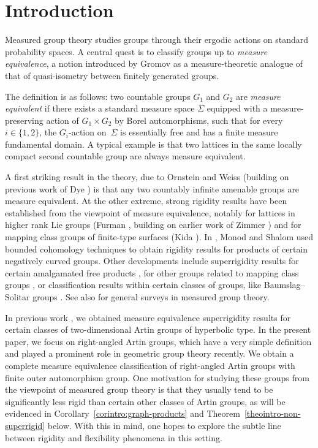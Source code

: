 \documentclass[11pt]{article}
\numberwithin{equation}{section}
\theoremstyle{plain}
\theoremstyle{definition}
\begin{document}
\section*{Introduction}

Measured group theory studies groups through their ergodic actions on standard probability spaces.
A central quest is to classify groups up to \emph{measure equivalence}, a notion introduced by Gromov \cite{Gro} as a measure-theoretic analogue of that of quasi-isometry between finitely generated groups.

The definition is as follows: two countable groups $G_1$ and $G_2$ are \emph{measure equivalent} if there exists a standard measure space $\Sigma$ equipped with a measure-preserving action of $G_1\times G_2$ by Borel automorphisms, such that for every $i\in\{1,2\}$, the $G_i$-action on~$\Sigma$ is essentially free and has a finite measure fundamental domain. A typical example is that two lattices in the same locally compact second countable group are always measure equivalent.

A first striking result in the theory, due to Ornstein and Weiss \cite{OW} (building on previous work of Dye \cite{Dye1,Dye2}) is that any two countably infinite amenable groups are measure equivalent. At the other extreme, strong rigidity results have been established from the viewpoint of measure equivalence, notably for lattices in higher rank Lie groups (Furman \cite{Fur}, building on earlier work of Zimmer \cite{Zim1,Zim2}) and for mapping class groups of finite-type surfaces (Kida \cite{Kid}). In \cite{MS}, Monod and Shalom used bounded cohomology techniques to obtain rigidity results for products of certain negatively curved groups. Other developments include superrigidity results for certain amalgamated free products \cite{Kid2}, for other groups related to mapping class groups \cite{CK}, or classification results within certain classes of groups, like Baumslag--Solitar groups \cite{kida2014invariants,HR}. See also \cite{Sha-survey,Gab-survey,Fur-survey} for general surveys in measured group theory.

In previous work \cite{HH}, we obtained measure equivalence superrigidity results for certain classes of two-dimensional Artin groups of hyperbolic type. In the present paper, we focus on right-angled Artin groups, which have a very simple definition and played a prominent role in geometric group theory recently.
We obtain a complete measure equivalence classification of right-angled Artin groups with finite outer automorphism group. One motivation for studying these groups from the viewpoint of measured group theory is that they usually tend to be significantly less rigid than certain other classes of Artin groups, as will be evidenced in Corollary~\ref{corintro:graph-products} and Theorem~\ref{theointro-non-superrigid} below. With this in mind, one hopes to explore the subtle line between rigidity and flexibility phenomena in this setting.
\end{document}
